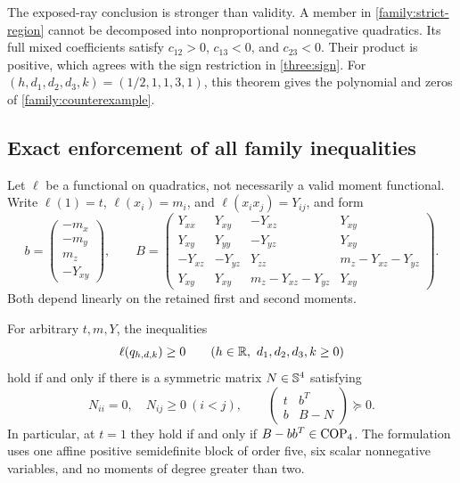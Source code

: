 The exposed-ray conclusion is stronger than validity. A member in
\eqref{family:strict-region} cannot be decomposed into nonproportional
nonnegative quadratics. Its full mixed coefficients satisfy
$c_{12}>0$, $c_{13}<0$, and $c_{23}<0$. Their product is positive, which
agrees with the sign restriction in \cref{three:sign}.
For $(h,d_1,d_2,d_3,k)=(1/2,1,1,3,1)$, this theorem gives the polynomial
and zeros of \cref{family:counterexample}.

\subsection{Exact enforcement of all family inequalities}
\label{family:enforcement-subsection}

Let $\ell$ be a functional on quadratics, not necessarily a valid moment
functional. Write
$\ell(1)=t$, $\ell(x_i)=m_i$, and $\ell(x_ix_j)=Y_{ij}$, and form
\begin{equation}
\label{family:b-B}
b=\begin{pmatrix}-m_x\\-m_y\\m_z\\-Y_{xy}\end{pmatrix},\qquad
B=\begin{pmatrix}
Y_{xx}&Y_{xy}&-Y_{xz}&Y_{xy}\\
Y_{xy}&Y_{yy}&-Y_{yz}&Y_{xy}\\
-Y_{xz}&-Y_{yz}&Y_{zz}&m_z-Y_{xz}-Y_{yz}\\
Y_{xy}&Y_{xy}&m_z-Y_{xz}-Y_{yz}&Y_{xy}
\end{pmatrix}.
\end{equation}
Both depend linearly on the retained first and second moments.

\begin{theorem}
\label{family:lmi}
For arbitrary $t,m,Y$, the inequalities
\[
\ell(q_{h,d,k})\ge0\qquad
(h\in\mathbb R,\ d_1,d_2,d_3,k\ge0)
\]
hold if and only if there is a symmetric matrix $N\in\mathbb S^4$ satisfying
\begin{equation}
\label{family:homogeneous-lmi}
N_{ii}=0,\quad N_{ij}\ge0\ (i<j),\qquad
\begin{pmatrix}t&b^T\\ b&B-N\end{pmatrix}\succeq0.
\end{equation}
In particular, at $t=1$ they hold if and only if
$B-bb^T\in\operatorname{COP}_4$. The formulation uses one affine positive semidefinite
block of order five, six scalar nonnegative variables, and no moments of
degree greater than two.
\end{theorem}

